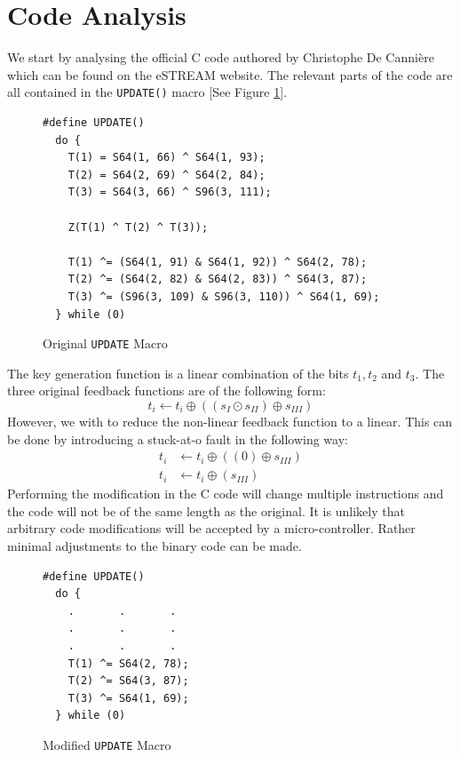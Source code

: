 \documentclass[conference]{IEEEtran}
\newcommand{\code}[1]{\texttt{#1}}
\begin{document}
\section{Code Analysis}

We start by analysing the official C code authored by Christophe De Canni\`ere which can be found on the eSTREAM website. The relevant parts of the code are all contained in the \code{UPDATE()} macro [See Figure \ref{orig:macro}].

\begin{figure}[H]
\begin{lstlisting}[style=snippet, frame=tlrb]
#define UPDATE()
  do { 
    T(1) = S64(1, 66) ^ S64(1, 93);
    T(2) = S64(2, 69) ^ S64(2, 84);
    T(3) = S64(3, 66) ^ S96(3, 111);

    Z(T(1) ^ T(2) ^ T(3));

    T(1) ^= (S64(1, 91) & S64(1, 92)) ^ S64(2, 78);
    T(2) ^= (S64(2, 82) & S64(2, 83)) ^ S64(3, 87);
    T(3) ^= (S96(3, 109) & S96(3, 110)) ^ S64(1, 69);
  } while (0)
\end{lstlisting}
\caption{Original \code{UPDATE} Macro}\label{orig:macro}
\end{figure}

The key generation function is a linear combination of the bits $t_1, t_2$ and $t_3$.
The three original feedback functions are of the following form: $$t_i \gets t_i \oplus ((s_I \odot s_{II}) \oplus s_{III})$$ However, we with to reduce the non-linear feedback function to a linear. This can be done by introducing a stuck-at-o fault in the following way:
\begin{align*}
t_i &\gets t_i \oplus ((0) \oplus s_{III})\\
t_i &\gets t_i \oplus (s_{III})
\end{align*}
Performing the modification in the C code will change multiple instructions and the code will not be of the same length as the original. It is unlikely that arbitrary code modifications will be accepted by a micro-controller. Rather minimal adjustments to the binary code can be made.
\begin{figure}[H]
\begin{lstlisting}[style=snippet, frame=tlrb]
#define UPDATE()
  do {
    .       .       .
    .       .       .
    .       .       .
    T(1) ^= S64(2, 78); 
    T(2) ^= S64(3, 87); 
    T(3) ^= S64(1, 69); 
  } while (0)
\end{lstlisting}
\caption{Modified \code{UPDATE} Macro}
\end{figure}
\end{document}
